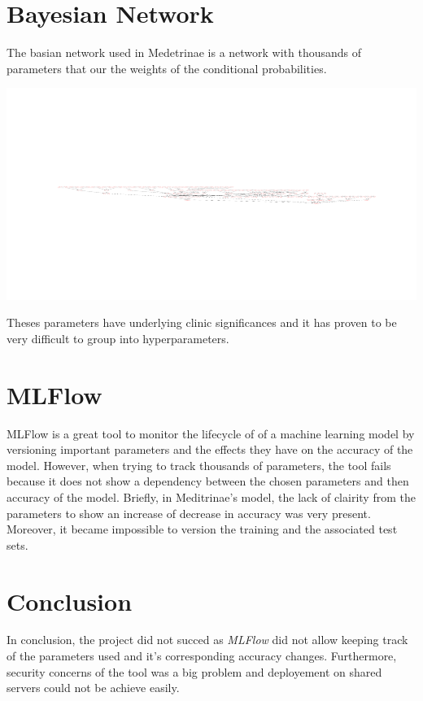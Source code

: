 \documentclass[12pt]{article}
\begin{document}
\section*{Bayesian Network}

The basian network used in Medetrinae is a network with thousands of parameters that our the weights of the conditional probabilities. 

\includegraphics[scale=0.22]{model}

Theses parameters have underlying clinic significances and it has proven to be very difficult to group into hyperparameters. 

\section*{MLFlow}

MLFlow is a great tool to monitor the lifecycle of of a machine learning model  by versioning important parameters and the effects they have on the accuracy of the model. However, when trying to track thousands of parameters, the tool fails because it does not show a dependency between the chosen parameters and then accuracy of the model. Briefly, in Meditrinae's model, the lack of clairity from the parameters to show an increase of decrease in accuracy was very present. Moreover, it became impossible to version the training and the associated test sets. 

\section*{Conclusion}

In conclusion, the project did not succed as \textit{MLFlow} did not allow keeping track of the parameters used and it's corresponding accuracy changes. Furthermore, security concerns of the tool was a big problem and deployement on shared servers could not be achieve easily. 
\end{document}
